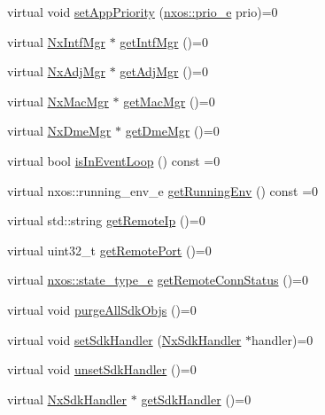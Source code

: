\begin{DoxyCompactItemize}
\item 
virtual void \mbox{\hyperlink{classnxos_1_1_nx_sdk_a46d9487216506aa19e5499759f5eaef7}{set\+App\+Priority}} (\mbox{\hyperlink{nx__common_8h_af446a76676837368bde9b15343ae21d5}{nxos\+::prio\+\_\+e}} prio)=0
\item 
virtual \mbox{\hyperlink{classnxos_1_1_nx_intf_mgr}{Nx\+Intf\+Mgr}} $\ast$ \mbox{\hyperlink{classnxos_1_1_nx_sdk_ac860ca0ab2bd58d28f990685c63906a0}{get\+Intf\+Mgr}} ()=0
\item 
virtual \mbox{\hyperlink{classnxos_1_1_nx_adj_mgr}{Nx\+Adj\+Mgr}} $\ast$ \mbox{\hyperlink{classnxos_1_1_nx_sdk_af6e3db3e34b003693d765835ea0dbb49}{get\+Adj\+Mgr}} ()=0
\item 
virtual \mbox{\hyperlink{classnxos_1_1_nx_mac_mgr}{Nx\+Mac\+Mgr}} $\ast$ \mbox{\hyperlink{classnxos_1_1_nx_sdk_adfa969f547080efd92f90f55ebc930c5}{get\+Mac\+Mgr}} ()=0
\item 
virtual \mbox{\hyperlink{classnxos_1_1_nx_dme_mgr}{Nx\+Dme\+Mgr}} $\ast$ \mbox{\hyperlink{classnxos_1_1_nx_sdk_a089933980bfe0466870510bb94158763}{get\+Dme\+Mgr}} ()=0
\item 
virtual bool \mbox{\hyperlink{classnxos_1_1_nx_sdk_ae2a6d199227de068bda5a720a7f29e94}{is\+In\+Event\+Loop}} () const =0
\item 
virtual nxos\+::running\+\_\+env\+\_\+e \mbox{\hyperlink{classnxos_1_1_nx_sdk_a6ebf9ceb029ce71ecfead7d9183ae4e3}{get\+Running\+Env}} () const =0
\item 
virtual std\+::string \mbox{\hyperlink{classnxos_1_1_nx_sdk_ad5cec82b30925240ce24e052b4c800c4}{get\+Remote\+Ip}} ()=0
\item 
virtual uint32\+\_\+t \mbox{\hyperlink{classnxos_1_1_nx_sdk_af922404fa50aa22299189f759cfbc4ca}{get\+Remote\+Port}} ()=0
\item 
virtual \mbox{\hyperlink{nx__common_8h_a7c257059d03188765435b36e95dbb764}{nxos\+::state\+\_\+type\+\_\+e}} \mbox{\hyperlink{classnxos_1_1_nx_sdk_a17102543d36406daaed8370802eecca3}{get\+Remote\+Conn\+Status}} ()=0
\item 
virtual void \mbox{\hyperlink{classnxos_1_1_nx_sdk_abfd0b2d92b51fc18bb30c059fa5b4a9b}{purge\+All\+Sdk\+Objs}} ()=0
\item 
virtual void \mbox{\hyperlink{classnxos_1_1_nx_sdk_a5f14e71747eac4fd5703d0cb490abe89}{set\+Sdk\+Handler}} (\mbox{\hyperlink{classnxos_1_1_nx_sdk_handler}{Nx\+Sdk\+Handler}} $\ast$handler)=0
\item 
virtual void \mbox{\hyperlink{classnxos_1_1_nx_sdk_ad86348d2475862e149dcdbe04634db3b}{unset\+Sdk\+Handler}} ()=0
\item 
virtual \mbox{\hyperlink{classnxos_1_1_nx_sdk_handler}{Nx\+Sdk\+Handler}} $\ast$ \mbox{\hyperlink{classnxos_1_1_nx_sdk_a079be3a7d8861fc9817903b7a6b0e9ab}{get\+Sdk\+Handler}} ()=0
\end{DoxyCompactItemize}
